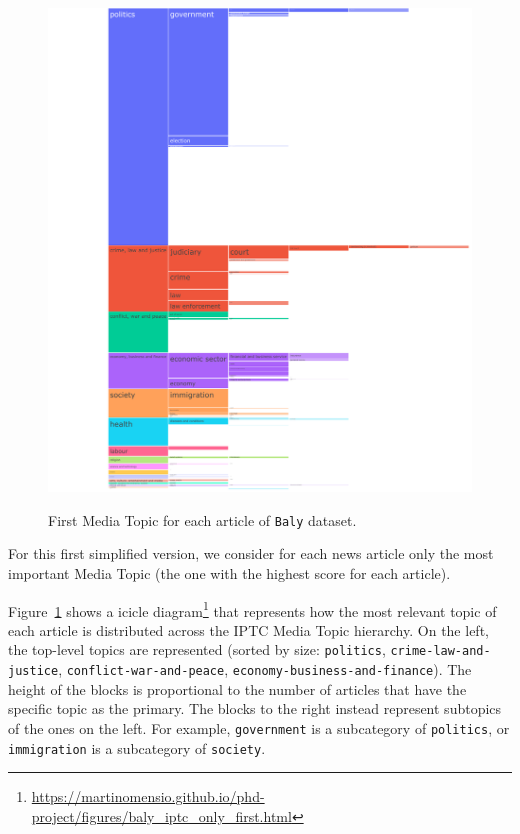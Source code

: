 \begin{figure}[!htbp]
    \centering
    \href{https://martinomensio.github.io/phd-project/figures/baly_iptc_only_first.html}{\includegraphics[trim={2.65cm 0cm 0cm 0cm},clip,width=\linewidth]{figures/baly_iptc_only_first.pdf}}
    \caption{First Media Topic for each article of \texttt{Baly} dataset.}
    \label{fig:baly_iptc_only_first}
\end{figure}

For this first simplified version, we consider for each news article only the most important Media Topic (the one with the highest score for each article).

Figure~\ref{fig:baly_iptc_only_first}
shows a icicle diagram\footnote{\url{https://martinomensio.github.io/phd-project/figures/baly_iptc_only_first.html}} that represents how the most relevant topic of each article is distributed across the IPTC Media Topic hierarchy.
On the left, the top-level topics are represented (sorted by size: \texttt{politics}, \texttt{crime-law-and-justice}, \texttt{conflict-war-and-peace}, \texttt{economy-business-and-finance}).
The height of the blocks is proportional to the number of articles that have the specific topic as the primary.
The blocks to the right instead represent subtopics of the ones on the left. For example, \texttt{government} is a subcategory of \texttt{politics}, or \texttt{immigration} is a subcategory of \texttt{society}.


